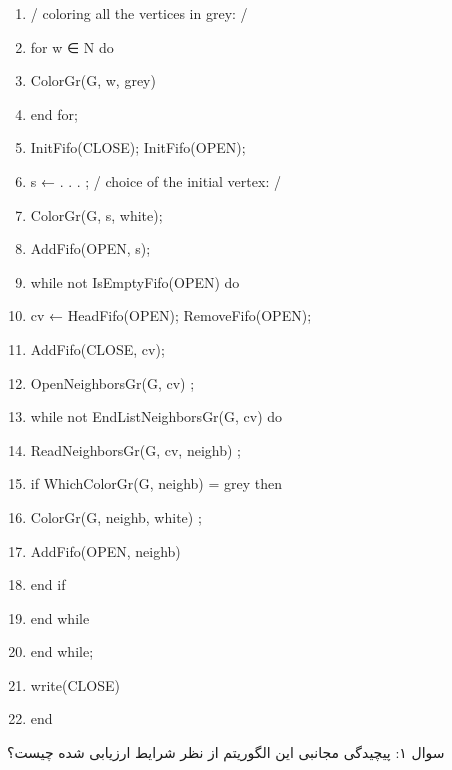 \documentclass{book} %
\begin{document}
\begin{latin}
    
    \begin{enumerate}
        
        \item / coloring all the vertices in grey: /
        \item for w ∈ N do
        \item   ColorGr(G, w, grey)
        \item end for;
        \item InitFifo(CLOSE); InitFifo(OPEN);
        \item s ← . . . ; / choice of the initial vertex: /
        \item ColorGr(G, s, white);
        \item AddFifo(OPEN, s);
        \item while not IsEmptyFifo(OPEN) do
        \item   cv ← HeadFifo(OPEN); RemoveFifo(OPEN);
        \item   AddFifo(CLOSE, cv);
        \item   OpenNeighborsGr(G, cv) ;
        \item   while not EndListNeighborsGr(G, cv) do
        \item   ReadNeighborsGr(G, cv, neighb) ;
        \item   if WhichColorGr(G, neighb) = grey then
        \item       ColorGr(G, neighb, white) ;
        \item       AddFifo(OPEN, neighb)
        \item   end if
        \item end while
        \item end while;
        \item write(CLOSE) 
        \item end
        
        
    \end{enumerate}
    

    سوال ۱: پیچیدگی مجانبی این الگوریتم از نظر شرایط ارزیابی شده چیست؟

\end{latin}
\end{document}
